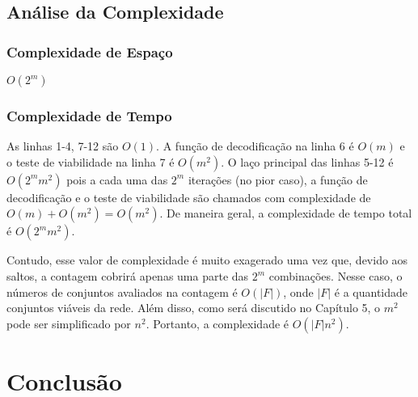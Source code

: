 \subsection{Análise da Complexidade}

\subsubsection{Complexidade de Espaço}
$O(2^m)$

\subsubsection{Complexidade de Tempo}

	As linhas 1-4, 7-12 são $O(1)$. A função de decodificação na linha 6 é $O(m)$ e o teste de viabilidade na linha 7 é $O(m^2)$. O laço principal das linhas 5-12 é $O(2^mm^2)$ pois a cada uma das $2^m$ iterações (no pior caso), a função de decodificação e o teste de viabilidade são chamados com complexidade de $O(m) + O(m^2) = O(m^2)$. De maneira geral, a complexidade de tempo total é $O(2^mm^2)$.
 
Contudo, esse valor de complexidade é muito exagerado uma vez que, devido aos saltos, a contagem cobrirá apenas uma parte das $2^m$ combinações. Nesse caso, o números de conjuntos avaliados na contagem é $O(|F|)$, onde $|F|$ é a quantidade conjuntos viáveis da rede. Além disso, como será discutido no Capítulo 5, o $m^2$ pode ser simplificado por $n^2$. Portanto, a complexidade é $O(|F|n^2)$.

\section{Conclusão}
